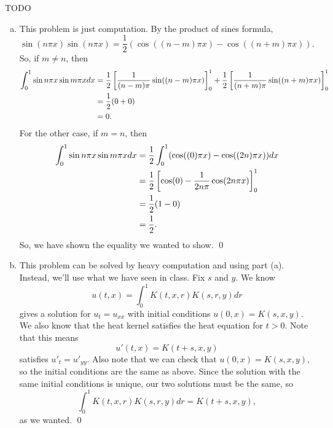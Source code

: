 \documentclass{article}
\begin{document}
\newpage
{} TODO \tri
\hop
\solution
\begin{enumerate}[(a)]
    \item This problem is just computation. By the product of sines formula, 
    \[\sin(n\pi x)\sin(n\pi x) = \frac{1}{2}(\cos((n-m)\pi x) - \cos((n+m)\pi x)).\]
    So, if $m \ne n$, then 
    \begin{align*}
        \int_0^1 \sin n\pi x \sin m \pi x dx&= \frac{1}{2}\sbr{\frac{1}{(n-m)\pi}\sin((n-m)\pi x)}_0^1+\frac{1}{2}\sbr{\frac{1}{(n+m)\pi}\sin((n+m)\pi x)}_0^1\\
        &= \frac{1}{2}(0+0)\\
        &= 0.
    \end{align*}
    For the other case, if $m = n$, then
    \begin{align*}
        \int_0^1 \sin n\pi x \sin m \pi x dx&=  \frac{1}{2}\int_0^1(\cos((0)\pi x) - \cos((2n)\pi x)) dx \\
        &= \frac{1}{2}\sbr{\cos(0) - \frac{1}{2n\pi}\cos(2n\pi x)}_0^1 \\
        &= \frac{1}{2}(1-0) \\
        &= \frac{1}{2}.
    \end{align*}
    So, we have shown the equality we wanted to show. \qed
    \item This problem can be solved by heavy computation and using part (a). Instead, we'll use what we have seen in class. Fix $s$ and $y$. We know 
    \[u(t,x)=\int_0^1K(t,x,r)K(s,r,y)dr\]
    gives a solution for $u_t = u_{xx}$ with initial conditions $u(0,x) = K(s,x,y)$. We also know that the heat kernel satisfies the heat equation for $t>0$. Note that this means
    \[u'(t,x) = K(t+s, x, y)\]
    satisfies $u'_t = u'_{yy}$. Also note that we can check that $u(0,x) = K(s,x,y)$, so the initial conditions are the same as above. Since the solution with the same initial conditions is unique, our two solutions must be the same, so 
    \[\int_0^1K(t,x,r)K(s,r,y)dr=K(t+s, x, y),\]
    as we wanted. \qed
\end{enumerate}
\end{document}
